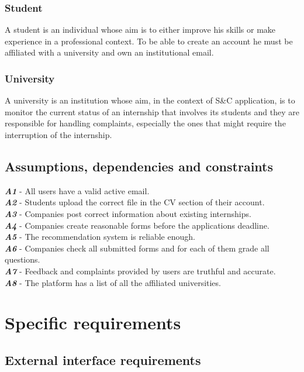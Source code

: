 \documentclass[11pt,twoside]{article}
\begin{document}
		\subsubsection{Student}
A student is an individual whose aim is to either improve his skills or make experience in a professional context. To be able to create an account he must be affiliated with a university and own an institutional email.
		\subsubsection{University}
A university is an institution whose aim, in the context of S\&C application, is to monitor the current status of an internship that involves its students and they are responsible for handling complaints, especially the ones that might require the interruption of the internship.

	\subsection{Assumptions, dependencies and constraints}
\begin{spacing}{1.5}
\textbf{\textit{A1}} - All users have a valid active email. \\
\textbf{\textit{A2}} - Students upload the correct file in the CV section of their account. \\
\textbf{\textit{A3}} - Companies post correct information about existing internships. \\
\textbf{\textit{A4}} - Companies create reasonable forms before the applications deadline. \\
\textbf{\textit{A5}} - The recommendation system is reliable enough. \\
\textbf{\textit{A6}} - Companies check all submitted forms and for each of them grade all questions. \\
\textbf{\textit{A7}} - Feedback and complaints provided by users are truthful and accurate. \\
\textbf{\textit{A8}} - The platform has a list of all the affiliated universities.
\end{spacing}
\newpage
\section{Specific requirements}
	\subsection{External interface requirements}
\end{document}
